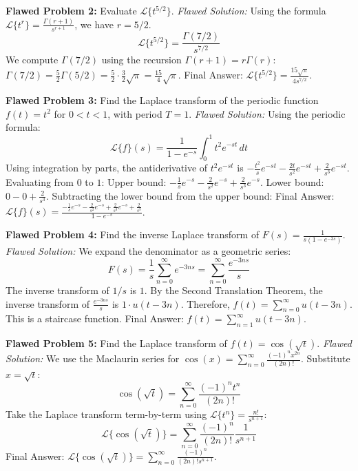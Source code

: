 \documentclass[11pt, letterpaper]{article}
\theoremstyle{definition}
\theoremstyle{remark}
\begin{document}
\vspace{1em}
\textbf{Flawed Problem 2:} Evaluate $\mathcal{L}\{t^{5/2}\}$.
\textit{Flawed Solution:} Using the formula $\mathcal{L}\{t^r\} = \frac{\Gamma(r+1)}{s^{r+1}}$, we have $r = 5/2$.
\[ \mathcal{L}\{t^{5/2}\} = \frac{\Gamma(7/2)}{s^{7/2}} \]
We compute $\Gamma(7/2)$ using the recursion $\Gamma(r+1) = r\Gamma(r)$:
$\Gamma(7/2) = \frac{5}{2} \Gamma(5/2) = \frac{5}{2} \cdot \frac{3}{2} \sqrt{\pi} = \frac{15}{4} \sqrt{\pi}$.
Final Answer: $\mathcal{L}\{t^{5/2}\} = \frac{15\sqrt{\pi}}{4 s^{7/2}}$.

\vspace{1em}
\textbf{Flawed Problem 3:} Find the Laplace transform of the periodic function $f(t) = t^2$ for $0 < t < 1$, with period $T=1$.
\textit{Flawed Solution:} Using the periodic formula:
\[ \mathcal{L}\{f\}(s) = \frac{1}{1 - e^{-s}} \int_0^1 t^2 e^{-st} \, dt \]
Using integration by parts, the antiderivative of $t^2 e^{-st}$ is $-\frac{t^2}{s}e^{-st} - \frac{2t}{s^2}e^{-st} + \frac{2}{s^3}e^{-st}$.
Evaluating from $0$ to $1$:
Upper bound: $-\frac{1}{s}e^{-s} - \frac{2}{s^2}e^{-s} + \frac{2}{s^3}e^{-s}$.
Lower bound: $0 - 0 + \frac{2}{s^3}$.
Subtracting the lower bound from the upper bound:
Final Answer: $\mathcal{L}\{f\}(s) = \frac{-\frac{1}{s}e^{-s} - \frac{2}{s^2}e^{-s} + \frac{2}{s^3}e^{-s} + \frac{2}{s^3}}{1 - e^{-s}}$.

\vspace{1em}
\textbf{Flawed Problem 4:} Find the inverse Laplace transform of $F(s) = \frac{1}{s(1 - e^{-3s})}$.
\textit{Flawed Solution:} We expand the denominator as a geometric series:
\[ F(s) = \frac{1}{s} \sum_{n=0}^\infty e^{-3ns} = \sum_{n=0}^\infty \frac{e^{-3ns}}{s} \]
The inverse transform of $1/s$ is $1$. By the Second Translation Theorem, the inverse transform of $\frac{e^{-3ns}}{s}$ is $1 \cdot u(t - 3n)$.
Therefore, $f(t) = \sum_{n=0}^\infty u(t - 3n)$.
This is a staircase function.
Final Answer: $f(t) = \sum_{n=1}^\infty u(t - 3n)$.

\vspace{1em}
\textbf{Flawed Problem 5:} Find the Laplace transform of $f(t) = \cos(\sqrt{t})$.
\textit{Flawed Solution:} We use the Maclaurin series for $\cos(x) = \sum_{n=0}^\infty \frac{(-1)^n x^{2n}}{(2n)!}$.
Substitute $x = \sqrt{t}$:
\[ \cos(\sqrt{t}) = \sum_{n=0}^\infty \frac{(-1)^n t^n}{(2n)!} \]
Take the Laplace transform term-by-term using $\mathcal{L}\{t^n\} = \frac{n!}{s^{n+1}}$:
\[ \mathcal{L}\{\cos(\sqrt{t})\} = \sum_{n=0}^\infty \frac{(-1)^n}{(2n)!} \frac{1}{s^{n+1}} \]
Final Answer: $\mathcal{L}\{\cos(\sqrt{t})\} = \sum_{n=0}^\infty \frac{(-1)^n}{(2n)! s^{n+1}}$.
\end{document}
